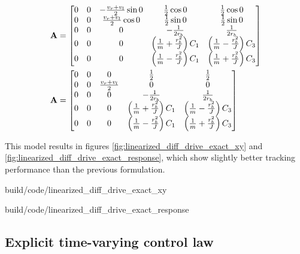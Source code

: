 \begin{align*}
  \mathbf{A} &=
  \begin{bmatrix}
    0 & 0 & -\frac{v_r + v_l}{2}\sin 0 & \frac{1}{2}\cos 0 &
      \frac{1}{2}\cos 0 \\
    0 & 0 & \frac{v_r + v_l}{2}\cos 0 & \frac{1}{2}\sin 0 &
      \frac{1}{2}\sin 0 \\
    0 & 0 & 0 & -\frac{1}{2r_b} & \frac{1}{2r_b} \\
    0 & 0 & 0 & \left(\frac{1}{m} + \frac{r_b^2}{J}\right) C_1 &
      \left(\frac{1}{m} - \frac{r_b^2}{J}\right) C_3 \\
    0 & 0 & 0 & \left(\frac{1}{m} - \frac{r_b^2}{J}\right) C_1 &
      \left(\frac{1}{m} + \frac{r_b^2}{J}\right) C_3
  \end{bmatrix} \\
  \mathbf{A} &=
  \begin{bmatrix}
    0 & 0 & 0 & \frac{1}{2} & \frac{1}{2} \\
    0 & 0 & \frac{v_r + v_l}{2} & 0 & 0 \\
    0 & 0 & 0 & -\frac{1}{2r_b} & \frac{1}{2r_b} \\
    0 & 0 & 0 & \left(\frac{1}{m} + \frac{r_b^2}{J}\right) C_1 &
      \left(\frac{1}{m} - \frac{r_b^2}{J}\right) C_3 \\
    0 & 0 & 0 & \left(\frac{1}{m} - \frac{r_b^2}{J}\right) C_1 &
      \left(\frac{1}{m} + \frac{r_b^2}{J}\right) C_3
  \end{bmatrix}
\end{align*}

This \gls{model} results in figures \ref{fig:linearized_diff_drive_exact_xy} and
\ref{fig:linearized_diff_drive_exact_response}, which show slightly better
tracking performance than the previous formulation.

\begin{bookfigure}
  \begin{minisvg}{build/code/linearized_diff_drive_exact_xy}
    \caption{Linearized differential drive controller x-y plot}
    \label{fig:linearized_diff_drive_exact_xy}
  \end{minisvg}
  \hfill
  \begin{minisvg}{build/code/linearized_diff_drive_exact_response}
    \caption{Linearized differential drive controller response}
    \label{fig:linearized_diff_drive_exact_response}
  \end{minisvg}
\end{bookfigure}

\subsection{Explicit time-varying control law}

